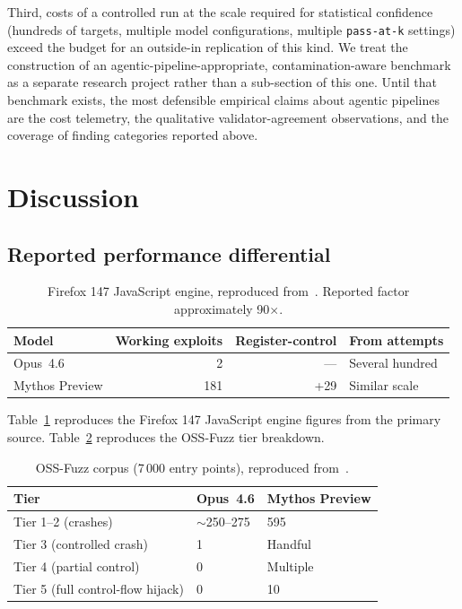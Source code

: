 \documentclass[11pt,a4paper]{article}
\begin{document}
Third, costs of a controlled run at the scale required for statistical
confidence (hundreds of targets, multiple model configurations, multiple
\texttt{pass-at-k} settings) exceed the budget for an outside-in
replication of this kind. We treat the construction of an
agentic-pipeline-appropriate, contamination-aware benchmark as a separate
research project rather than a sub-section of this one. Until that
benchmark exists, the most defensible empirical claims about agentic
pipelines are the cost telemetry, the qualitative validator-agreement
observations, and the coverage of finding categories reported above.

\section{Discussion}
\label{sec:discussion}

\subsection{Reported performance differential}

\begin{table}[h]
\centering
\small
\begin{tabularx}{\linewidth}{@{}lrrX@{}}
\toprule
Model & Working exploits & Register-control & From attempts \\
\midrule
Opus~4.6         & 2   & ---  & Several hundred \\
Mythos Preview   & 181 & +29  & Similar scale \\
\bottomrule
\end{tabularx}
\caption{Firefox 147 JavaScript engine, reproduced from~\citet{anthropicMythos2026}.
Reported factor approximately 90$\times$.}
\label{tab:firefox}
\end{table}

Table~\ref{tab:firefox} reproduces the Firefox 147 JavaScript engine
figures from the primary source. Table~\ref{tab:ossfuzz} reproduces the
OSS-Fuzz tier breakdown.

\begin{table}[h]
\centering
\small
\begin{tabularx}{\linewidth}{@{}lXX@{}}
\toprule
Tier & Opus~4.6 & Mythos Preview \\
\midrule
Tier 1--2 (crashes)                & $\sim$250--275 & 595 \\
Tier 3 (controlled crash)          & 1              & Handful \\
Tier 4 (partial control)           & 0              & Multiple \\
Tier 5 (full control-flow hijack)  & 0              & 10 \\
\bottomrule
\end{tabularx}
\caption{OSS-Fuzz corpus (7\,000 entry points), reproduced
from~\citet{anthropicMythos2026}.}
\label{tab:ossfuzz}
\end{table}
\end{document}
